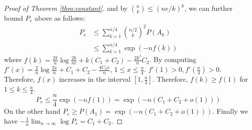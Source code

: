 \documentclass[conference]{IEEEtran}
\begin{document}
\begin{proof}[Proof of Theorem \ref{thm:constant}]
and by $\binom{n}{k} \leq (ne/k)^k$, we can further bound $P_e$ above as follows:
\begin{align*}
P_e & \leq \sum_{k=1}^{n/4} \binom{n/2}{k}^2 P(A_k) \\
& \leq \sum_{k=1}^{n/4} \exp(-nf(k))
\end{align*}
where $f(k) = \frac{2k}{n}\log \frac{2k}{ne} + k(C_1+C_2) - \frac{2k^2}{n}C_2$.
By computing $f'(x)= \frac{2}{n} \log \frac{2x}{n} + C_1+C_2 - \frac{4C_2x}{n}$, $1\leq x \leq \frac{n}{4}$.
$f'(1) > 0 , f'(\frac{n}{4}) > 0$. Therefore, $f(x)$ increases in the interval $[1, \frac{n}{4}]$.
Therefore, $f(k) \geq f(1)$ for $1\leq k \leq \frac{n}{4}$.
\begin{equation}
P_e \leq \frac{n}{4}\exp(-nf(1)) = \exp(-n (C_1+C_2+o(1)))
\end{equation}
On the other hand $P_e \geq P(A_1) = \exp(-n(C_1+C_2+o(1)))$.
Finally we have $-\frac{1}{n} \lim_{n \to \infty} \log P_e = C_1+C_2$.
\end{proof}
\end{document}
